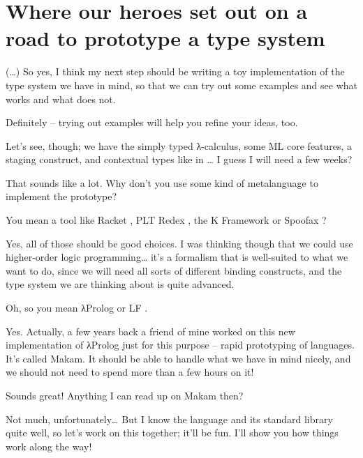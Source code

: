 \section{Where our heroes set out on a road to prototype a type
system}\label{where-our-heroes-set-out-on-a-road-to-prototype-a-type-system}

 (\ldots{}) So yes, I think my next step should be
writing a toy implementation of the type system we have in mind, so that
we can try out some examples and see what works and what does not.

 Definitely -- trying out examples will help you
refine your ideas, too.

\heroSTUDENT{} Let's see, though; we have the simply typed \foreignlanguage{greek}{λ}-calculus, some ML
core features, a staging construct, and contextual types like in
\citet{nanevski2008contextual}\ldots{} I guess I will need a few weeks?

\heroADVISOR{} That sounds like a lot. Why don't you use some kind of
metalanguage to implement the prototype?

\heroSTUDENT{} You mean a tool like Racket \citep{racket-manifesto}, PLT Redex
\citep{felleisen2009semantics}, the K Framework
\citep{k-framework-main-reference} or Spoofax
\citep{spoofax-main-reference}?

\heroADVISOR{} Yes, all of those should be good choices. I was thinking though
that we could use higher-order logic programming\ldots{} it's a
formalism that is well-suited to what we want to do, since we will need
all sorts of different binding constructs, and the type system we are
thinking about is quite advanced.

\heroSTUDENT{} Oh, so you mean \foreignlanguage{greek}{λ}Prolog \citep{miller1988overview} or LF
\citep{lf-main-reference}.

\heroADVISOR{} Yes. Actually, a few years back a friend of mine worked on this
new implementation of \foreignlanguage{greek}{λ}Prolog just for this purpose -- rapid prototyping
of languages. It's called Makam. It should be able to handle what we
have in mind nicely, and we should not need to spend more than a few
hours on it!

\heroSTUDENT{} Sounds great! Anything I can read up on Makam then?

\heroADVISOR{} Not much, unfortunately\ldots{} But I know the language and its
standard library quite well, so let's work on this together; it'll be
fun. I'll show you how things work along the way!


